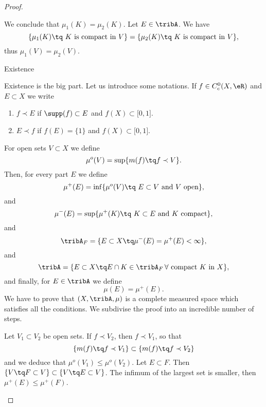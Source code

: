 \begin{proof}
\begin{subproof}
		We conclude that \( \mu_1(K)=\mu_2(K)\).
		\spitem[Unicity]
		Let \( E\in\tribA\). We have
		\begin{equation}
			\{ \mu_1(K)\tq \text{ \( K\) is compact in \( V\)} \} = \{ \mu_2(K)\tq \text{ \( K\) is compact in \( V\)} \},
		\end{equation}
		thus \( \mu_1(V)=\mu_2(V)\).
	\end{subproof}
	\begin{center}
		Existence
	\end{center}
	Existence is the big part. Let us introduce some notations. If \( f\in C^0_c(X,\eR)\) and \( E\subset X\) we write
	\begin{enumerate}
		\item \( f\prec E\) if \( \supp(f)\subset E\) and \( f(X)\subset \mathopen[ 0 , 1 \mathclose]\).
		\item \( E\prec f\) if \( f(E)=\{ 1 \}\) and \( f(X)\subset \mathopen[ 0 , 1 \mathclose]\).
	\end{enumerate}
	For open sets \( V\subset X\) we define
	\begin{equation}
		\mu^o(V)=\sup\{ m(f)\tq f\prec V \}.
	\end{equation}
	Then, for every part \( E\) we define
	\begin{equation}
		\mu^+(E)=\inf\{ \mu^o(V)\tq \text{ \( E\subset V\) and \( V\) open} \},
	\end{equation}
	and
	\begin{equation}        \label{EQooSIKUooJeeIqI}
		\mu^-(E)=\sup\{ \mu^+(K)\tq \text{ \( K\subset E\) and \( K\) compact} \},
	\end{equation}
	and
	\begin{equation}
		\tribA_F=\{ E\subset X\tq \mu^-(E)=\mu^+(E)<\infty \},
	\end{equation}
	and
	\begin{equation}
		\tribA=\{ E\subset X\tq E\cap K\in \tribA_F\,\text{\( \forall\) compact \( K\) in \( X\)} \},
	\end{equation}
	and finally, for \( E\in \tribA\) we define
	\begin{equation}
		\mu(E)=\mu^+(E).
	\end{equation}
	We have to prove that \( (X,\tribA,\mu)\) is a complete measured space which satisfies all the conditions. We subdivise the proof into an incredible number of steps.
	\begin{subproof}
		\spitem[\( \mu^o\) is increasing]     \label{ITEMooOMDSooQiYmaP}
		Let \( V_1\subset V_2\) be open sets. If \( f\prec V_2\), then \( f\prec V_1\), so that
		\begin{equation}
			\{ m(f)\tq f\prec V_1 \}\subset \{ m(f)\tq f\prec V_2 \}
		\end{equation}
		and we deduce that \( \mu^o(V_1)\leq \mu^o(V_2)\).
		\spitem[\( \mu^+\) is increasing]       \label{ITEMooGODTooQNQzfz}
		Let \( E\subset F\). Then \( \{ V\tq F\subset V \}\subset \{ V\tq E\subset V \}\). The infimum of the largest set is smaller, then \( \mu^+(E)\leq\mu^+(F)\).


\end{subproof}
\end{proof}
